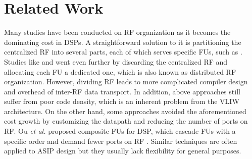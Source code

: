 \section{Related Work}
\label{cha:related}
    Many studies have been conducted on RF organization as it becomes the dominating cost in DSPs\cite{register}.
    A straightforward solution to it is partitioning the centralized RF into several parts, each of which serves specific FUs, such as \cite{cluster}.
    Studies like \cite{synzen} and \cite{dsplite} went even further by discarding the centralized RF and allocating each FU a dedicated one, which is also known as distributed RF organization.
    However, dividing RF leads to more complicated compiler design and overhead of inter-RF data transport.
    In addition, above approaches still suffer from poor code density, which is an inherent problem from the VLIW architecture.
    On the other hand, some approaches avoided the aforementioned cost growth by customizing the datapath and reducing the number of ports on RF.
    Ou \textit{et al.} proposed composite FUs for DSP, which cascade FUs with a specific order and demand fewer ports on RF \cite{cascade} \cite{hearaid}.
    Similar techniques are often applied to ASIP design but they usually lack flexibility for general purposes.
